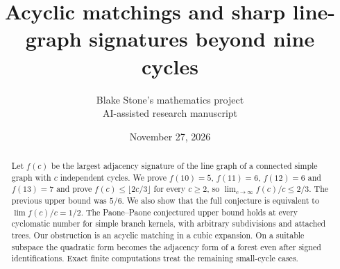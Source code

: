 \documentclass[11pt]{article}
\title{Acyclic matchings and sharp line-graph signatures beyond nine cycles}
\author{Blake Stone's mathematics project\\\small AI-assisted research manuscript}
\date{November 27, 2026}
\begin{document}
\maketitle
\begin{abstract}
Let $f(c)$ be the largest adjacency signature of the line graph of a connected simple graph with $c$ independent cycles. We prove $f(10)=5$, $f(11)=6$, $f(12)=6$ and $f(13)=7$ and prove $f(c)\le\lfloor2c/3\rfloor$ for every $c\ge2$, so $\lim_{c\to\infty}f(c)/c\le2/3$. The previous upper bound was $5/6$. We also show that the full conjecture is equivalent to $\lim f(c)/c=1/2$. The Paone--Paone conjectured upper bound holds at every cyclomatic number for simple branch kernels, with arbitrary subdivisions and attached trees. Our obstruction is an acyclic matching in a cubic expansion. On a suitable subspace the quadratic form becomes the adjacency form of a forest even after signed identifications. Exact finite computations treat the remaining small-cycle cases.
\end{abstract}
\end{document}
